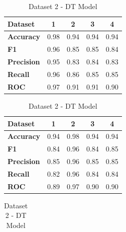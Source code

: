 \begin{table}[H]
    \centering
    \caption{DT model cross-performance results}\label{tab:dt_model_cross-performance_results}
        \begin{subtable}[H]{0.45\textwidth}
            \centering
            \begin{tabular}{|l|c|c|c|c|}
            \hline
            \textbf{Dataset} & \textbf{1} & \textbf{2} & \textbf{3} & \textbf{4} \\
            \hline
            \textbf{Accuracy} & 0.98 & 0.94 & 0.94 & 0.94 \\
            \textbf{F1} & 0.96 & 0.85 & 0.85 & 0.84 \\
            \textbf{Precision} & 0.95 & 0.83 & 0.84 & 0.83 \\
            \textbf{Recall} & 0.96 & 0.86 & 0.85 & 0.85 \\
            \textbf{ROC} & 0.97 & 0.91 & 0.91 & 0.90 \\
            \hline
            \end{tabular}
            \caption{Dataset 1 - DT Model}\label{subtab:dataset_1_dt_model}
        \end{subtable}
    \quad
    \begin{subtable}[H]{0.45\textwidth}
        \centering
        \begin{tabular}{|l|c|c|c|c|}
            \hline
            \textbf{Dataset} & \textbf{1} & \textbf{2} & \textbf{3} & \textbf{4} \\
            \hline
            \textbf{Accuracy} & 0.94 & 0.98 & 0.94 & 0.94 \\
            \textbf{F1} & 0.84 & 0.96 & 0.84 & 0.85 \\
            \textbf{Precision} & 0.85 & 0.96 & 0.85 & 0.85 \\
            \textbf{Recall} & 0.82 & 0.96 & 0.84 & 0.84 \\
            \textbf{ROC} & 0.89 & 0.97 & 0.90 & 0.90 \\
            \hline
        \end{tabular}
        \caption{Dataset 2 - DT Model}\label{subtab:dataset_2_dt_model}
    \end{subtable}
    \quad
    \begin{subtable}[H]{0.45\textwidth}
        \centering
        \begin{tabular}{|l|c|c|c|c|}

\end{tabular}
\end{subtable}
\end{table}
